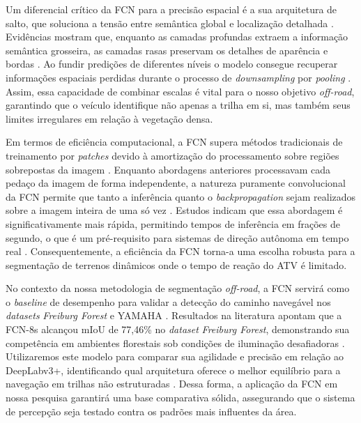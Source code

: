 \documentclass[a4paper,10pt, twocolumn]{article}
\begin{document}
Um diferencial crítico da FCN para a precisão espacial é a sua arquitetura de salto, 
que soluciona a tensão entre semântica global e localização detalhada \cite{Long2015, GARCIAGARCIA201841}. Evidências 
mostram que, enquanto as camadas profundas extraem a informação semântica grosseira, as camadas rasas 
preservam os detalhes de aparência e bordas \cite{Long2015, Sehar2022, Maturana2017}. Ao fundir predições de
diferentes níveis o modelo consegue recuperar informações espaciais perdidas durante o processo de \textit{downsampling} 
por \textit{pooling} \cite{Long2015, LATEEF2019321, 10742323}. Assim, essa capacidade de 
combinar escalas é vital para o nosso objetivo \textit{off-road}, garantindo que o veículo identifique não 
apenas a trilha em si, mas também seus limites irregulares em relação à vegetação densa.

Em termos de eficiência computacional, a FCN supera métodos tradicionais de treinamento 
por \textit{patches} devido à amortização do processamento sobre regiões sobrepostas 
da imagem \cite{Long2015, GARCIAGARCIA201841}. Enquanto abordagens anteriores processavam 
cada pedaço da imagem de forma independente, a natureza puramente convolucional da FCN 
permite que tanto a inferência quanto o \textit{backpropagation} sejam realizados sobre a 
imagem inteira de uma só vez \cite{Long2015, s19112577}. Estudos indicam que essa abordagem é 
significativamente mais rápida, permitindo tempos de inferência em frações de segundo, o que é 
um pré-requisito para sistemas de direção autônoma em tempo real \cite{Long2015, Maturana2017, 10742323}. Consequentemente, a 
eficiência da FCN torna-a uma escolha robusta para a segmentação de terrenos dinâmicos onde o tempo de reação do ATV é limitado.

No contexto da nossa metodologia de segmentação \textit{off-road}, a FCN servirá como o \textit{baseline} de desempenho para validar a 
detecção do caminho navegável nos \textit{datasets} \textit{Freiburg Forest} e YAMAHA \cite{Maturana2017, LATEEF2019321, s19112577}. 
Resultados na literatura apontam que a FCN-8s alcançou mIoU de 77,46\% no \textit{dataset} \textit{Freiburg Forest}, demonstrando 
sua competência em ambientes florestais sob condições de iluminação desafiadoras \cite{LATEEF2019321}. Utilizaremos este 
modelo para comparar sua agilidade e precisão em relação ao DeepLabv3+, identificando qual arquitetura oferece o melhor 
equilíbrio para a navegação em trilhas não estruturadas \cite{Sgibnev2020, Maturana2017}. Dessa forma, a aplicação 
da FCN em nossa pesquisa garantirá uma base comparativa sólida, assegurando que o sistema de percepção seja 
testado contra os padrões mais influentes da área.
\end{document}

